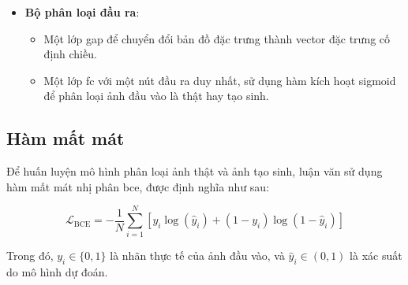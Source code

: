 \begin{itemize}
		\item \textbf{Bộ phân loại đầu ra}:
		\begin{itemize}
			\item Một lớp \gls{gap} để chuyển đổi bản đồ đặc trưng thành vector đặc trưng cố định chiều.
			\item Một lớp \gls{fc} với một nút đầu ra duy nhất, sử dụng hàm kích hoạt \gls{sigmoid} để phân loại ảnh đầu vào là thật hay tạo sinh.
		\end{itemize}
\end{itemize}

\subsection{Hàm mất mát}
\label{ss:ham_mat_mat_bce}
Để huấn luyện mô hình phân loại ảnh thật và ảnh tạo sinh, luận văn sử dụng hàm mất mát nhị phân \gls{bce}, được định nghĩa như sau:

\begin{equation}
	\mathcal{L}_{\mathrm{BCE}} = -\frac{1}{N} \sum_{i=1}^{N} \left[ y_i \log(\hat{y}_i) + (1 - y_i)\log(1 - \hat{y}_i) \right]
\end{equation}

Trong đó, \( y_i \in \{0, 1\} \) là nhãn thực tế của ảnh đầu vào, và \( \hat{y}_i \in (0, 1) \) là xác suất do mô hình dự đoán.

